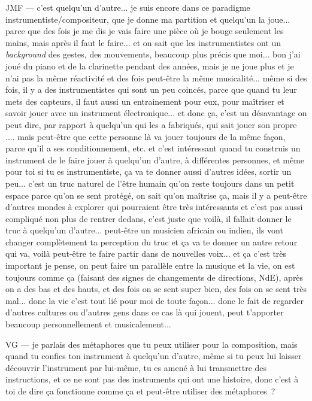 JMF — c'est quelqu'un d'autre... je suis encore dans ce paradigme instrumentiste/compositeur, que je donne ma partition et quelqu'un la joue... parce que des fois je me dis je vais faire une pièce où je bouge seulement les mains, mais après il faut le faire... et on sait que les instrumentistes ont un \textit{background} des gestes, des mouvements, beaucoup plus précis que moi... bon j'ai joué du piano et de la clarinette pendant des années, mais je ne joue plus et je n'ai pas la même réactivité et des fois peut-être la même musicalité... même si des fois, il y a des instrumentistes qui sont un peu coincés, parce que quand tu leur mets des capteurs, il faut aussi un entrainement pour eux, pour maîtriser et savoir jouer avec un instrument électronique... et donc ça, c'est un désavantage on peut dire, par rapport à quelqu'un qui les a fabriqués, qui sait jouer son propre .... mais peut-être que cette personne là va jouer toujours de la même façon, parce qu'il a ses conditionnement, etc. et c'est intéressant quand tu construis un instrument de le faire jouer à quelqu'un d'autre, à différentes personnes, et même pour toi si tu es instrumentiste, ça va te donner aussi d'autres idées, sortir un peu... c'est un truc naturel de l'être humain qu'on reste toujours dans un petit espace parce qu'on se sent protégé, on sait qu'on maîtrise ça, mais il y a peut-être d'autres mondes à explorer qui pourraient être très intéressants et c'est pas aussi compliqué non plus de rentrer dedans, c'est juste que voilà, il fallait donner le truc à quelqu'un d'autre... peut-être un musicien africain ou indien, ils vont changer complètement ta perception du truc et ça va te donner un autre retour qui va, voilà peut-être te faire partir dans de nouvelles voix... et ça c'est très important je pense, on peut faire un parallèle entre la musique et la vie, on est toujours comme ça (faisant des signes de changements de directions, NdE), après on a des bas et des hauts, et des fois on se sent super bien, des fois on se sent très mal... donc la vie c'est tout lié pour moi de toute façon... donc le fait de regarder d'autres cultures ou d'autres gens dans ce cas là qui jouent, peut t'apporter beaucoup personnellement et musicalement...  

VG — je parlais des métaphores que tu peux utiliser pour la composition, mais quand tu confies ton instrument à quelqu'un d'autre, même si tu peux lui laisser découvrir l'instrument par lui-même, tu es amené à lui transmettre des instructions, et ce ne sont pas des instruments qui ont une histoire, donc c'est à toi de dire ça fonctionne comme ça et peut-être utiliser des métaphores ? 


